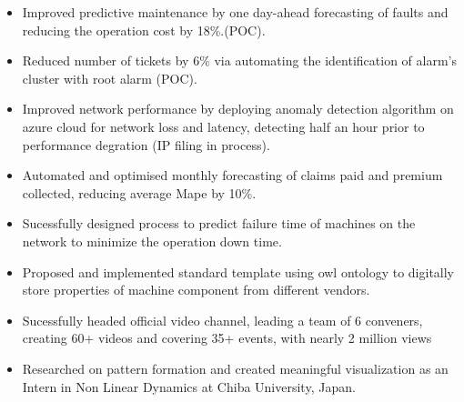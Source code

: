 \documentclass[10pt,a4paper,ragged2e,withhyper]{altacv}
\begin{document}
\begin{itemize}
\item Improved predictive maintenance by one day-ahead forecasting of faults and reducing the operation cost by 18\%.(POC).
\item Reduced number of tickets by 6\% via automating the identification of alarm’s cluster with root alarm (POC).
\item Improved network performance by deploying anomaly detection algorithm on azure cloud for network loss and latency, detecting half an hour prior to performance degration (IP filing in process).
\item Automated and optimised monthly forecasting of claims paid and premium collected, reducing average Mape by 10\%.
\end{itemize}


\label{sec:org0f4afcb}

\begin{itemize}
\item Sucessfully designed process to predict failure time of machines on the network to minimize the operation down time.
\item Proposed and implemented standard template using owl ontology to digitally store properties of machine component from different vendors.
\item Sucessfully headed official video channel, leading a team of 6 conveners, creating 60+ videos and covering 35+ events, with nearly 2 million views
\item Researched on pattern formation and created meaningful visualization as an Intern in Non Linear Dynamics at Chiba University, Japan.
\end{itemize}

\end{document}
